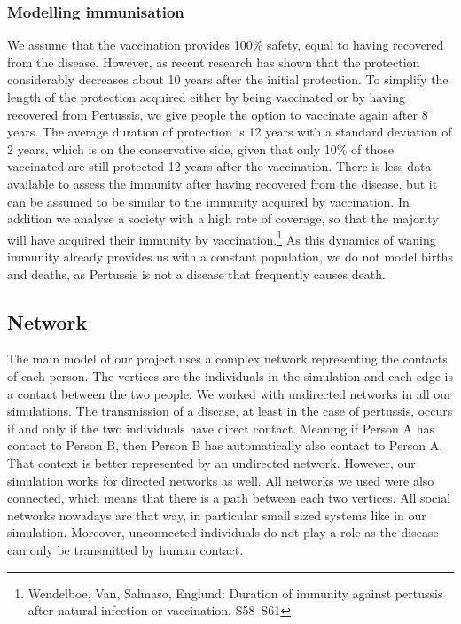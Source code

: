 \documentclass[11pt]{article}
\begin{document}
\subsubsection{Modelling immunisation}
We assume that the vaccination provides 100\% safety, equal to having recovered from the disease. However, as recent research has shown that the protection considerably decreases about 10  years after the initial protection. 
To simplify the length of the protection acquired either by being vaccinated or by having recovered from Pertussis, we give people the option to vaccinate again after 8 years. The average duration of protection is 12 years with a standard deviation of 2 years, which is on the conservative side, given that only 10\% of those vaccinated are still protected 12 years after the vaccination. There is less data available to assess the immunity after having recovered from the disease, but it can be assumed to be similar to the immunity acquired by vaccination. In addition we analyse a society with a high rate of coverage, so that the majority will have acquired their immunity by vaccination.\footnote{Wendelboe, Van, Salmaso, Englund: Duration of immunity against pertussis after natural infection or vaccination. S58–S61} 
As this dynamics of waning immunity already provides us with a constant population, we do not model births and deaths, as Pertussis is not a disease that frequently causes death. 

\subsection{Network}

The main model of our project uses a complex network representing the contacts of each person. The vertices are the individuals in the simulation and each edge is a contact between the two people. We worked with undirected networks in all our simulations. The transmission of a disease, at least in the case of pertussis, occurs if and only if the two individuals have direct contact. Meaning if Person A has contact to Person B, then Person B has automatically also contact to Person A. That context is better represented by an undirected network. However, our simulation works for directed networks as well.
All networks we used were also connected, which means that there is a path between each two vertices. All social networks nowadays are that way, in particular small sized systems like in our simulation. Moreover, unconnected individuals do not play a role as the disease can only be transmitted by human contact.
\vspace{14px}
\end{document}
